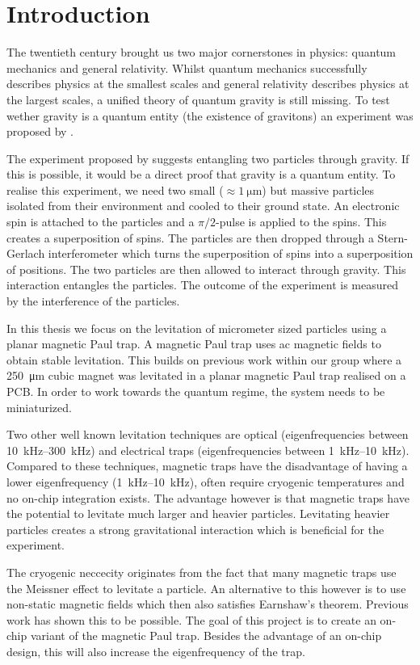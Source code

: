 \chapter{Introduction}
\label{chap:introduction}
The twentieth century brought us two major cornerstones in physics: quantum mechanics and general relativity. Whilst quantum mechanics successfully describes physics at the smallest scales and general relativity describes physics at the largest scales, a unified theory of quantum gravity is still missing. To test wether gravity is a quantum entity (the existence of gravitons) an experiment was proposed by \textcite{bose_spin_2017}.

The experiment proposed by \citeauthor{bose_spin_2017} suggests entangling two particles through gravity. If this is possible, it would be a direct proof that gravity is a quantum entity. To realise this experiment, we need two small ($\approx \qty{1}{\micro\meter}$) but massive particles isolated from their environment and cooled to their ground state. An electronic spin is attached to the particles and a $\pi/2$-pulse is applied to the spins. This creates a superposition of spins. The particles are then dropped through a Stern-Gerlach interferometer which turns the superposition of spins into a superposition of positions. The two particles are then allowed to interact through gravity. This interaction entangles the particles. The outcome of the experiment is measured by the interference of the particles.

In this thesis we focus on the levitation of micrometer sized particles using a planar magnetic Paul trap. A magnetic Paul trap uses ac magnetic fields to obtain stable levitation. This builds on previous work within our group where a \qty{250}{\micro\meter} cubic  magnet was levitated in a planar magnetic Paul trap realised on a PCB\cite{eli, mart}. In order to work towards the quantum regime, the system needs to be miniaturized.

Two other well known levitation techniques are optical (eigenfrequencies between \qtyrange{10}{300}{\kilo\hertz}) and electrical traps (eigenfrequencies between \qtyrange{1}{10}{\kilo\hertz})\cite{levitodynamics}. Compared to these techniques, magnetic traps have the disadvantage of having a lower eigenfrequency (\qtyrange{1}{10}{\kilo\hertz}), often require cryogenic temperatures and no on-chip integration exists\cite{levitodynamics}. The advantage however is that magnetic traps have the potential to levitate much larger and heavier particles. Levitating heavier particles creates a strong gravitational interaction which is beneficial for the experiment.

The cryogenic neccecity originates from the fact that many magnetic traps use the Meissner effect to levitate a particle. An alternative to this however is to use non-static magnetic fields which then also satisfies Earnshaw's theorem. Previous work has shown this to be possible\cite{perdriat,eli,mart}. The goal of this project is to create an on-chip variant of the magnetic Paul trap. Besides the advantage of an on-chip design, this will also increase the eigenfrequency of the trap\cite{perdriat}.
